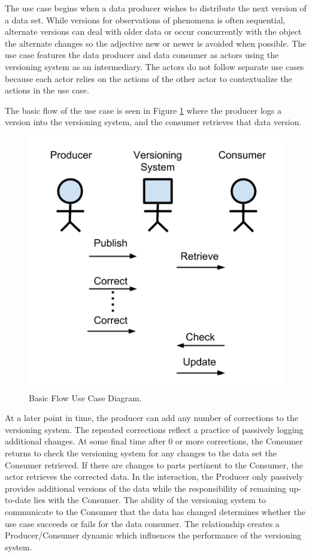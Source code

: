 The use case begins when a data producer wishes to distribute the next version of a data set.
While versions for observations of phenomena is often sequential, alternate versions can deal with older data or occur concurrently with the object the alternate changes so the adjective new or newer is avoided when possible.
The use case features the data producer and data consumer as actors using the versioning system as an intermediary.
The actors do not follow separate use cases because each actor relies on the actions of the other actor to contextualize the actions in the use case.

The basic flow of the use case is seen in Figure \ref{UCD1} where the producer logs a version into the versioning system, and the consumer retrieves that data version.
\begin{figure}
	\centering
	\includegraphics[scale=1]{figures/UC_Diagram1.png}
	\caption{Basic Flow Use Case Diagram.}
	\label{UCD1}
\end{figure}
At a later point in time, the producer can add any number of corrections to the versioning system.
The repeated corrections reflect a practice of passively logging additional changes.
At some final time after 0 or more corrections, the Consumer returns to check the versioning system for any changes to the data set the Consumer retrieved.
If there are changes to parts pertinent to the Consumer, the actor retrieves the corrected data.
In the interaction, the Producer only passively provides additional versions of the data while the responsibility of remaining up-to-date lies with the Consumer.
The ability of the  versioning system to communicate to the Consumer that the data has changed determines whether the use case succeeds or fails for the data consumer.
The relationship creates a Producer/Consumer dynamic which influences the performance of the versioning system.

